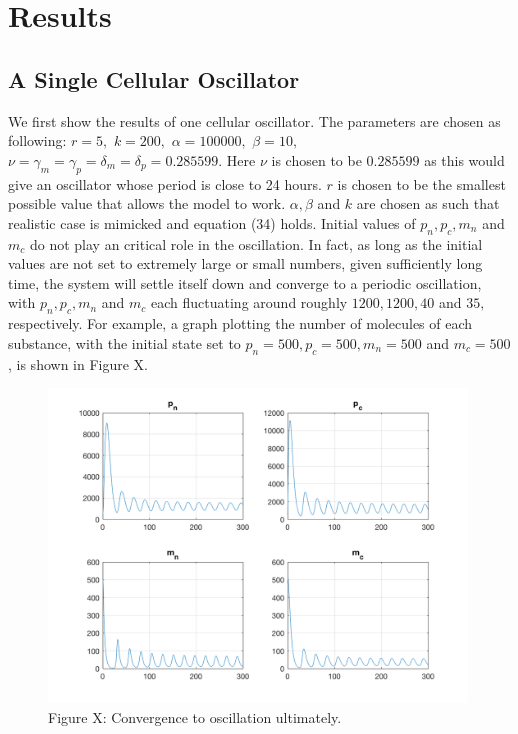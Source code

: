 \documentclass[12pt]{article}
\renewcommand{\(}{\left (}
\renewcommand{\)}{\right )}
\begin{document}
\section{Results}
\subsection{A Single Cellular Oscillator}
\hspace{5mm} We first show the results of one cellular oscillator. The parameters are chosen as following: $r = 5,$ $k= 200,$ $\alpha = 100000,$ $\beta = 10,$ $\nu = \gamma_m = \gamma_p = \delta_m =\delta_p = 0.285599.$ Here $\nu$ is chosen to be $0.285599$ as this would give an oscillator whose period is close to 24 hours. $r$ is chosen to be the smallest possible value that allows the model to work. $\alpha, \beta$ and $k$ are chosen as such that realistic case is mimicked and equation (34) holds. Initial values of $p_n, p_c, m_n$ and $m_c$ do not play an critical role in the oscillation. In fact, as long as the initial values are not set to extremely large or small numbers, given sufficiently long time, the system will settle itself down and converge to a periodic oscillation, with $p_n, p_c, m_n$ and $m_c$ each fluctuating around roughly $1200, 1200, 40$ and $35,$ respectively. For example, a graph plotting the number of molecules of each substance, with the initial state set to $p_n = 500, p_c = 500, m_n = 500$ and $m_c = 500$, is shown in Figure X.
\begin{figure}[h]
    \centering
	\begin{minipage}{0.5\textwidth}
		\centering
		\includegraphics[width=0.99\textwidth]{single_cell_show_convergence.png}
		\caption*{\small Figure X: Convergence to oscillation ultimately.}
	\end{minipage}

\end{figure}
\end{document}
